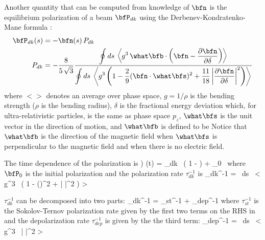 {Another quantity that can be computed from knowledge of $\bfn$ is the equilibrium polarization of a beam
$\bfP_{dk}$ using the Derbenev-Kondratenko-Mane formula \cite{b:barber99}:
\begin{align}
  \bfP_{dk}(s) &= -\bfn(s) \, P_{dk} \\
  P_{dk} &= -\frac{8}{5 \, \sqrt{3}}
  \frac{\displaystyle \oint ds \,\left< g^3 \, \what\bfb \cdot 
    \left( \bfn - \frac{\partial \bfn}{\partial \delta} \right) \right>}
  {\displaystyle \oint ds \, \left< g^3 \left( 1 - \frac{2}{9} (\bfn \cdot \what\bfs)^2 + 
    \frac{11}{18} \left| \frac{\partial \bfn}{\partial \delta} \right|^2 \right) \right>}
    \nonumber
\end{align}
where $<>$ denotes an average over phase space, $g = 1/\rho$ is the bending
strength ($\rho$ is the bending radius), $\delta$ is the fractional energy deviation which, for
ultra-relativistic particles, is the same as phase space $p_z$, $\what\bfs$ is the unit vector in
the direction of motion, and $\what\bfb$ is defined to be
\Begineq
  \what\bfb \equiv {}
\Endeq
Notice that $\what\bfb$ is the direction of the magnetic field when $\what\bfs$ is perpendicular to
the magnetic field and when there is no electric field.

The time dependence of the polarization is \cite{b:barber99})
\Begineq
  \bfP(t) = \bfP_{dk} \, \left( 1 -  \right) + \bfP_0 \, 
\Endeq
where $\bfP_0$ is the initial polarization and the polarization rate $\tau_{dk}^{-1}$ is 
\Begineq
  \tau_{dk}^{-1} =  
   \, \oint ds \, \left< g^3 \, \left( 1 -  (\bfn \cdot \what\bfs)^2 + 
   \left| \frac{\partial \bfn}{\partial \delta} \right|^2 \right) \right>
  \label{t583}
\Endeq

$\tau_{dk}^{-1}$ can be decomposed into two parts:
\Begineq
  \tau_{dk}^{-1} = \tau_{st}^{-1} + \tau_{dep}^{-1}
  \label{tdk}
\Endeq
where $\tau_{st}^{-1}$ is the Sokolov-Ternov polarization rate given by the first two terms on the
RHS in  and the depolarization rate $\tau_{dep}^{-1}$ is given by the the third term:
\Begineq
  \tau_{dep}^{-1} =  
   \, \oint ds \, \left< g^3 \,
   \left| \frac{\partial \bfn}{\partial \delta} \right|^2 \right>
  \label{tdep}
\Endeq

}

